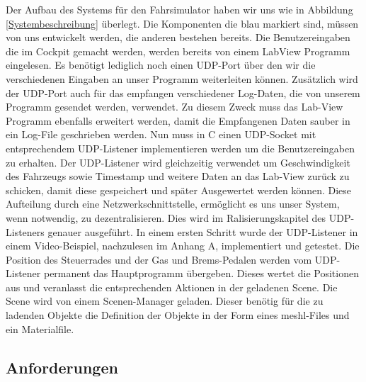 Der Aufbau des Systems für den Fahrsimulator haben wir uns wie in Abbildung \ref{Systembeschreibung} überlegt. Die Komponenten die blau markiert sind, müssen von uns entwickelt werden, die anderen bestehen bereits. 
Die Benutzereingaben die im Cockpit gemacht werden, werden bereits von einem LabView Programm eingelesen. Es benötigt lediglich noch einen UDP-Port über den wir die verschiedenen Eingaben an unser Programm weiterleiten können. Zusätzlich wird der UDP-Port auch für das empfangen verschiedener Log-Daten, die von unserem Programm gesendet werden, verwendet. Zu diesem Zweck muss das Lab-View Programm ebenfalls erweitert werden, damit die Empfangenen Daten sauber in ein Log-File geschrieben werden. 
Nun muss in C einen UDP-Socket mit entsprechendem UDP-Listener implementieren werden um die Benutzereingaben zu erhalten. Der UDP-Listener wird gleichzeitig verwendet um Geschwindigkeit des Fahrzeugs sowie Timestamp und weitere Daten an das Lab-View zurück zu schicken, damit diese gespeichert und später Ausgewertet werden können. Diese Aufteilung durch eine Netzwerkschnittstelle, ermöglicht es uns unser System, wenn notwendig, zu dezentralisieren. Dies wird im Ralisierungskapitel des UDP-Listeners genauer ausgeführt. In einem ersten Schritt wurde der UDP-Listener in einem Video-Beispiel, nachzulesen im Anhang A, implementiert und getestet. 
Die Position des Steuerrades und der Gas und Brems-Pedalen werden vom UDP-Listener permanent das Hauptprogramm übergeben. Dieses wertet die Positionen aus und veranlasst die entsprechenden Aktionen in der geladenen Scene. Die Scene wird von einem Scenen-Manager geladen. Dieser benötig für die zu ladenden Objekte die Definition der Objekte in der Form eines meshl-Files und ein Materialfile. 

\subsection{Anforderungen}